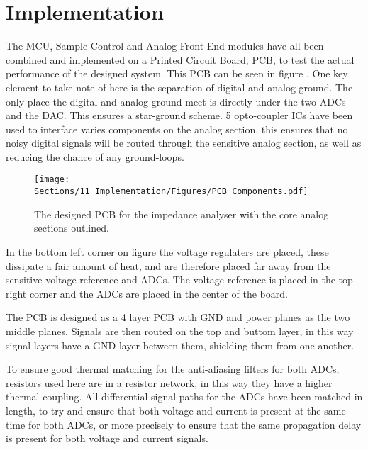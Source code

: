 \chapter{Implementation}\label{subsec:PCBDesign}
The MCU, Sample Control and Analog Front End modules have all been combined and implemented on a Printed Circuit Board, PCB, to test the actual performance of the designed system. This PCB can be seen in figure . One key element to take note of here is the separation of digital and analog ground. The only place the digital and analog ground meet is directly under the two ADCs and the DAC. This ensures a star-ground scheme. 5 opto-coupler ICs have been used to interface varies components on the analog section, this ensures that no noisy digital signals will be routed through the sensitive analog section, as well as reducing the chance of any ground-loops. 

\begin{figure}[H]
   \centering
   \texttt{[image: Sections/11\_Implementation/Figures/PCB\_Components.pdf]}
   \caption{The designed PCB for the impedance analyser with the core analog sections outlined.}
   \label{fig_PCB}
\end{figure}

In the bottom left corner on figure  the voltage regulaters are placed, these dissipate a fair amount of heat, and are therefore placed far away from the sensitive voltage reference and ADCs. The voltage reference is placed in the top right corner and the ADCs are placed in the center of the board. 

The PCB is designed as a 4 layer PCB with GND and power planes as the two middle planes. Signals are then routed on the top and buttom layer, in this way signal layers have a GND layer between them, shielding them from one another.

To ensure good thermal matching for the anti-aliasing filters for both ADCs, resistors used here are in a resistor network, in this way they have a higher thermal coupling. All differential signal paths for the ADCs have been matched in length, to try and ensure that both voltage and current is present at the same time for both ADCs, or more precisely to ensure that the same propagation delay is present for both voltage and current signals.